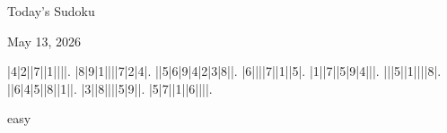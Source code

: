 \documentclass{article}
\begin{document}
\begin{center}
\Huge{Today's Sudoku}
\end{center}
\begin{center}
\Large{May 13, 2026}
\end{center}
\begin{sudoku}
|4|2||7||1||||.
|8|9|1||||7|2|4|.
||5|6|9|4|2|3|8||.
|6||||7||1||5|.
|1||7||5|9|4|||.
|||5||1||||8|.
||6|4|5||8||1||.
|3||8||||5|9||.
|5|7||1||6||||.
\end{sudoku}
\begin{center}
easy\end{center}
\end{document}
